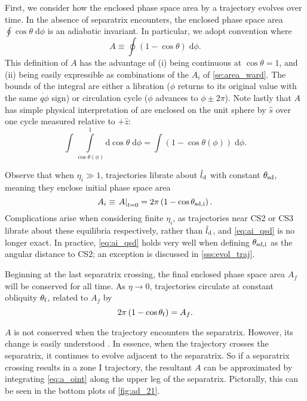 \documentclass[
        fleqn,
        usenatbib,
        referee,
    ]{mnras}
\newcommand*{\at}[1]{\left.#1\right|}
\newcommand*{\p}[1]{\left(#1\right)}
\begin{document}
First, we consider how the enclosed phase space area by a trajectory evolves
over time. In the absence of separatrix encounters, the enclosed phase space
area $\oint \cos\theta \;\mathrm{d}\phi$ is an adiabatic invariant. In
particular, we adopt convention where
\begin{equation}
    A \equiv \oint \p{1 - \cos \theta}\;\mathrm{d}\phi.\label{eq:a_oint}
\end{equation}
This definition of $A$ has the advantage of (i) being continuous at $\cos \theta
= 1$, and (ii) being easily expressible as combinations of the $A_i$ of
\autoref{se:area_ward}. The bounds of the integral are either a libration
($\phi$ returns to its original value with the same $\dot{q\phi}$ sign) or
circulation cycle ($\phi$ advances to $\phi \pm 2\pi$). Note lastly that $A$ has
simple physical interpretation of are enclosed on the unit sphere by $\hat{s}$
over one cycle measured relative to $+\hat{z}$:
\begin{equation}
    \int \int\limits_{\cos \theta(\phi)}^1
        \mathrm{d}\cos\theta\;\mathrm{d}\phi = \int \p{1 - \cos \theta(\phi)}
            \;\mathrm{d}\phi.
\end{equation}

Observe that when $\eta_i \gg 1$, trajectories librate about $\hat{l}_{\rm d}$
with constant $\theta_{\rm sd}$, meaning they enclose initial phase space area
\begin{equation}
    A_i \equiv \at{A}_{t = 0}
        = 2\pi\p{1 - \cos \theta_{\rm sd, i}}.\label{eq:ai_qsd}
\end{equation}
Complications arise when considering finite $\eta_i$, as trajectories near CS2
or CS3 librate about these equilibria respectively, rather than $\hat{l}_{\rm
d}$, and \autoref{eq:ai_qsd} is no longer exact. In practice,
\autoref{eq:ai_qsd} holds very well when defining $\theta_{\rm sd, i}$ as the
angular distance to CS2; an exception is discussed in \autoref{sss:evol_traj}.

Beginning at the last separatrix crossing, the final enclosed phase space area
$A_f$ will be conserved for all time. As $\eta \to 0$, trajectories circulate at
constant obliquity $\theta_{\rm f}$, related to $A_f$ by
\begin{equation}
    2\pi\p{1 - \cos \theta_{\rm f}} = A_f. \label{eq:qfaf}
\end{equation}

$A$ is not conserved when the trajectory encounters the separatrix. Howover,
its change is easily understood \citep{henrard1982}. In essence, when the
trajectory crosses the separatrix, it continues to evolve adjacent to the
separatrix. So if a separatrix crossing results in a zone I trajectory, the
resultant $A$ can be approximated by integrating \autoref{eq:a_oint} along the
upper leg of the separatrix. Pictorally, this can be seen in the bottom plots of
\autoref{fig:ad_21}.
\end{document}
